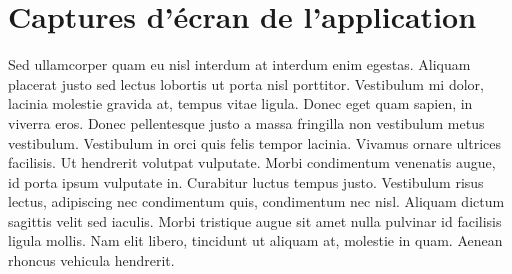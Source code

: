 
\section{Captures d'écran de l'application}

Sed ullamcorper quam eu nisl interdum at interdum enim egestas. Aliquam placerat justo sed lectus lobortis ut porta nisl porttitor. Vestibulum mi dolor, lacinia molestie gravida at, tempus vitae ligula. Donec eget quam sapien, in viverra eros. Donec pellentesque justo a massa fringilla non vestibulum metus vestibulum. Vestibulum in orci quis felis tempor lacinia. Vivamus ornare ultrices facilisis. Ut hendrerit volutpat vulputate. Morbi condimentum venenatis augue, id porta ipsum vulputate in. Curabitur luctus tempus justo. Vestibulum risus lectus, adipiscing nec condimentum quis, condimentum nec nisl. Aliquam dictum sagittis velit sed iaculis. Morbi tristique augue sit amet nulla pulvinar id facilisis ligula mollis. Nam elit libero, tincidunt ut aliquam at, molestie in quam. Aenean rhoncus vehicula hendrerit.